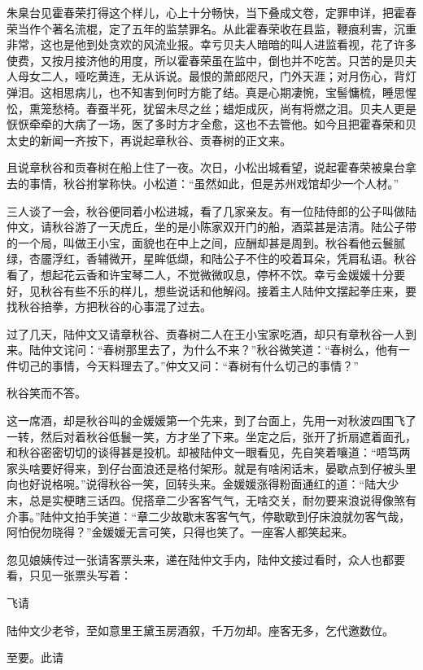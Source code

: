 \documentclass[12pt,UTF8]{ctexbook}
\begin{document}
{{{朱臬台见霍春荣打得这个样儿，心上十分畅快，当下叠成文卷，定罪申详，把霍春荣当作个著名流棍，定了五年的监禁罪名。从此霍春荣收在县监，鞭痕利害，沉重非常，这也是他到处贪欢的风流业报。幸亏贝夫人暗暗的叫人进监看视，花了许多使费，又按月接济他的用度，所以霍春荣虽在监中，倒也并不吃苦。只苦的是贝夫人母女二人，哑吃黄连，无从诉说。最恨的萧郎咫尺，门外天涯；对月伤心，背灯弹泪。这相思病儿，也不知害到何时方能了结。真是心期凄惋，宝髻慵梳，睡思惺忪，熏笼愁椅。春蚕半死，犹留未尽之丝；蜡炬成灰，尚有将燃之泪。贝夫人更是恹恹牵牵的大病了一场，医了多时方才全愈，这也不去管他。如今且把霍春荣和贝太史的新闻一齐按下，再说起章秋谷、贡春树的正文来。

且说章秋谷和贡春树在船上住了一夜。次日，小松出城看望，说起霍春荣被臬台拿去的事情，秋谷拊掌称快。小松道：“虽然如此，但是苏州戏馆却少一个人材。”

三人谈了一会，秋谷便同着小松进城，看了几家亲友。有一位陆侍郎的公子叫做陆仲文，请秋谷游了一天虎丘，坐的是小陈家双开门的船，酒菜甚是洁清。陆公子带的一个局，叫做王小宝，面貌也在中上之间，应酬却甚是周到。秋谷看他云鬟腻绿，杏靥浮红，香辅微开，星眸低缬，和陆公子不住的咬着耳朵，凭肩私语。秋谷看了，想起花云香和许宝琴二人，不觉微微叹息，停杯不饮。幸亏金媛媛十分要好，见秋谷有些不乐的样儿，想些说话和他解闷。接着主人陆仲文摆起拳庄来，要找秋谷掊拳，方把秋谷的心事混了过去。

过了几天，陆仲文又请章秋谷、贡春树二人在王小宝家吃酒，却只有章秋谷一人到来。陆仲文诧问：“春树那里去了，为什么不来？”秋谷微笑道：“春树么，他有一件切己的事情，今天料理去了。”仲文又问：“春树有什么切己的事情？”

秋谷笑而不答。

这一席酒，却是秋谷叫的金媛媛第一个先来，到了台面上，先用一对秋波四围飞了一转，然后对着秋谷低鬟一笑，方才坐了下来。坐定之后，张开了折扇遮着面孔，和秋谷密密切切的谈得甚是投机。却被陆仲文一眼看见，先自笑着嚷道：“唔笃两家头啥要好得来，到仔台面浪还是格付架形。就是有啥闲话末，晏歇点到仔被头里向也好说格啘。”说得秋谷一笑，回转头来。金媛媛涨得粉面通红的道：“陆大少末，总是实梗瞎三话四。倪搭章二少客客气气，无啥交关，耐勿要来浪说得像煞有介事。”陆仲文拍手笑道：“章二少故歇末客客气气，停歇歇到仔床浪就勿客气哉，阿怕倪勿晓得？”金媛媛无言可笑，只得也笑了。一座客人都笑起来。

忽见娘姨传过一张请客票头来，递在陆仲文手内，陆仲文接过看时，众人也都要看，只见一张票头写着：

飞请

陆仲文少老爷，至如意里王黛玉房酒叙，千万勿却。座客无多，乞代邀数位。

至要。此请

}}}
\end{document}
